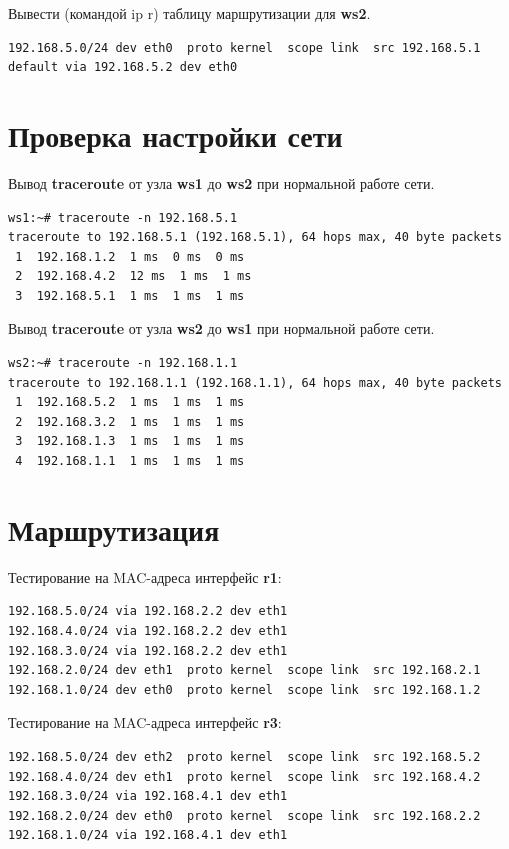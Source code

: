 \documentclass[a4paper,12pt]{article}
\begin{document}
Вывести (командой ip r) таблицу маршрутизации для \textbf{ws2}.

\begin{Verbatim}
192.168.5.0/24 dev eth0  proto kernel  scope link  src 192.168.5.1 
default via 192.168.5.2 dev eth0 
\end{Verbatim}


\section{Проверка настройки сети}

Вывод \textbf{traceroute} от узла \textbf{ws1} до \textbf{ws2} при нормальной работе сети.

\begin{Verbatim}
ws1:~# traceroute -n 192.168.5.1
traceroute to 192.168.5.1 (192.168.5.1), 64 hops max, 40 byte packets
 1  192.168.1.2  1 ms  0 ms  0 ms
 2  192.168.4.2  12 ms  1 ms  1 ms
 3  192.168.5.1  1 ms  1 ms  1 ms
\end{Verbatim}

Вывод \textbf{traceroute} от узла \textbf{ws2} до \textbf{ws1} при нормальной работе сети.

\begin{Verbatim}
ws2:~# traceroute -n 192.168.1.1
traceroute to 192.168.1.1 (192.168.1.1), 64 hops max, 40 byte packets
 1  192.168.5.2  1 ms  1 ms  1 ms
 2  192.168.3.2  1 ms  1 ms  1 ms
 3  192.168.1.3  1 ms  1 ms  1 ms
 4  192.168.1.1  1 ms  1 ms  1 ms
\end{Verbatim}


\section{Маршрутизация}


Тестирование на MAC-адреса интерфейс \textbf{r1}:

\begin{Verbatim}
192.168.5.0/24 via 192.168.2.2 dev eth1 
192.168.4.0/24 via 192.168.2.2 dev eth1 
192.168.3.0/24 via 192.168.2.2 dev eth1 
192.168.2.0/24 dev eth1  proto kernel  scope link  src 192.168.2.1 
192.168.1.0/24 dev eth0  proto kernel  scope link  src 192.168.1.2 
\end{Verbatim}

Тестирование на MAC-адреса интерфейс \textbf{r3}:

\begin{Verbatim}
192.168.5.0/24 dev eth2  proto kernel  scope link  src 192.168.5.2 
192.168.4.0/24 dev eth1  proto kernel  scope link  src 192.168.4.2 
192.168.3.0/24 via 192.168.4.1 dev eth1 
192.168.2.0/24 dev eth0  proto kernel  scope link  src 192.168.2.2 
192.168.1.0/24 via 192.168.4.1 dev eth1 
\end{Verbatim}
\end{document}
